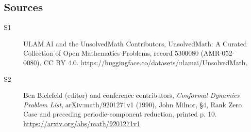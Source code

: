 \documentclass[11pt]{article}
\begin{document}
\subsection{Sources}
\begin{description}
\item[\hypertarget{source:5300080:1}{S1}] ULAM.AI and the UnsolvedMath Contributors, UnsolvedMath: A Curated Collection of Open Mathematics Problems, record 5300080 (AMR-052-0080). CC BY 4.0. \url{https://huggingface.co/datasets/ulamai/UnsolvedMath}.
\item[\hypertarget{source:5300080:2}{S2}] Ben Bielefeld (editor) and conference contributors, \emph{Conformal Dynamics Problem List}, arXiv:math/9201271v1 (1990), John Milnor, \S4, Rank Zero Case and preceding periodic-component reduction, printed p. 10. \url{https://arxiv.org/abs/math/9201271v1}.
\end{description}
\label{end:5300080}
\end{document}

